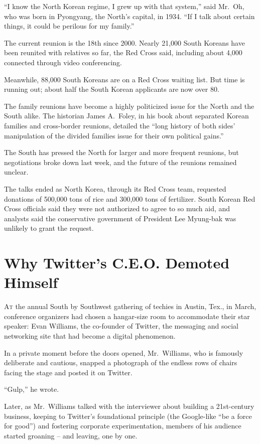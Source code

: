 ﻿\documentclass[12pt]{article}
\begin{document}
``I know the North Korean regime, I grew up with that system,'' said Mr.~Oh, who was born in
Pyongyang, the North's capital, in 1934. ``If I talk about certain things, it could be perilous for
my family.''

The current reunion is the 18th since 2000. Nearly 21,000 South Koreans have been reunited with
relatives so far, the Red Cross said, including about 4,000 connected through video conferencing.

Meanwhile, 88,000 South Koreans are on a Red Cross waiting list. But time is running out; about half
the South Korean applicants are now over 80.

The family reunions have become a highly politicized issue for the North and the South alike. The
historian James A.~Foley, in his book about separated Korean families and cross-border reunions,
detailed the ``long history of both sides' manipulation of the divided families issue for their own
political gains.''

The South has pressed the North for larger and more frequent reunions, but negotiations broke down
last week, and the future of the reunions remained unclear.

The talks ended as North Korea, through its Red Cross team, requested donations of 500,000 tons of
rice and 300,000 tons of fertilizer. South Korean Red Cross officials said they were not authorized
to agree to so much aid, and analysts said the conservative government of President Lee Myung-bak
was unlikely to grant the request.

\section{Why Twitter's C.E.O. Demoted Himself}

\lettrine{A}{t} the annual South by Southwest gathering of techies in
Austin, Tex., in March, conference organizers had chosen a hangar-size room to accommodate their
star speaker: Evan Williams, the co-founder of Twitter, the messaging and social networking site
that had become a digital phenomenon.

In a private moment before the doors opened, Mr.~Williams, who is famously deliberate and cautious,
snapped a photograph of the endless rows of chairs facing the stage and posted it on Twitter.

``Gulp,'' he wrote.

Later, as Mr.~Williams talked with the interviewer about building a 21st-century business, keeping
to Twitter's foundational principle (the Google-like ``be a force for good'') and fostering
corporate experimentation, members of his audience started groaning -- and leaving, one by one.
\end{document}
